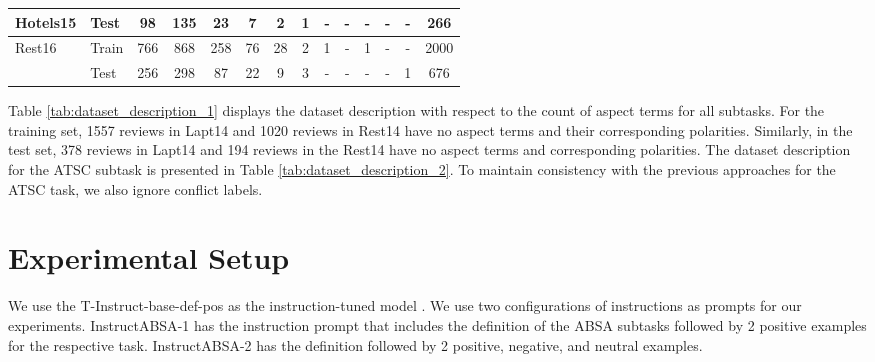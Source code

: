 \documentclass[11pt]{article}
\newcommand{\name}{\textsc{I}nstruct\textsc{ABSA}\xspace}
\begin{document}
\begin{table*}[]
{\begin{tabular}{l|l|c|c|c|c|c|c|c|c|c|c|c|c}
Hotels15 & Test  & 98                        & 135                       & 23                       & 7                        & 2                        & 1                        & -                         & -                         & -                         & -                         & -     & 266                         \\ \hline


Rest16 & Train & 766                & 868                      & 258                       & 76                       & 28                       & 2                        & 1                        & -                      & 1    & -    & -                         & 2000                        \\
    & Test  & 256                        & 298                       & 87                       & 22                        & 9                        & 3                        & -                         & -                         & -                         & -                         & 1     & 676                         \\ \hline

            
\end{tabular}
}
\caption{Count of Aspects for the ATE, ASTE, AOOE, AOPE and AOSTE subtasks. \# is the count of samples that have  aspects/aspect-sentiment polarity pairs in them. \#NO is the number of samples that have no aspect/aspect-sentiment polarity pairs in them.}
\label{tab:dataset_description_1}
\end{table*} 
Table \ref{tab:dataset_description_1} displays the dataset description with respect to the count of aspect terms for all subtasks. 
For the training set, 1557 reviews in Lapt14 and 1020 reviews in Rest14 have no aspect terms and their corresponding polarities. 
Similarly, in the test set, 378 reviews in Lapt14 and 194 reviews in the Rest14 have no aspect terms and corresponding polarities. 
The dataset description for the ATSC subtask is presented in Table \ref{tab:dataset_description_2}. 
To maintain consistency with the previous approaches for the ATSC task, we also ignore conflict labels.

\section{Experimental Setup}
We use the T-Instruct-base-def-pos as the instruction-tuned model .
We use two configurations of instructions as prompts for our experiments. 
\name{}-1 has the instruction prompt that includes the definition of the ABSA subtasks followed by 2 positive examples for the respective task.
\name{}-2 has the definition followed by 2 positive, negative, and neutral examples.
\end{document}
